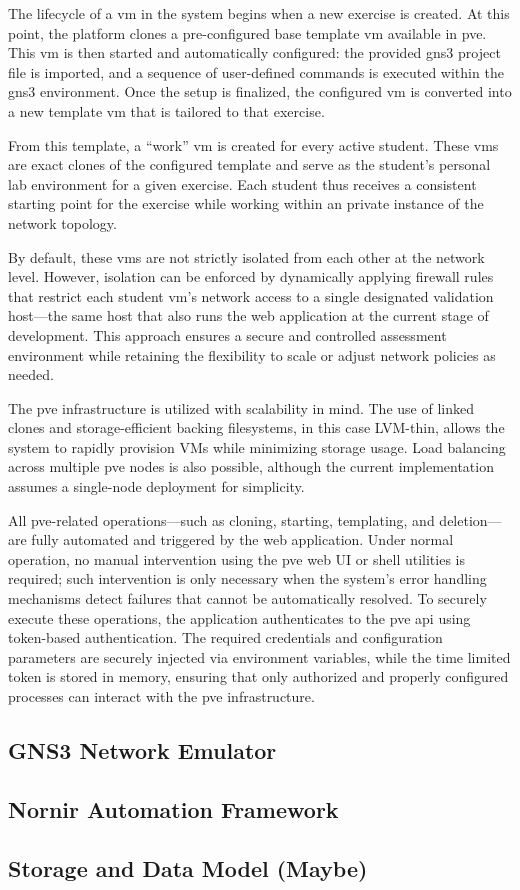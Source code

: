 The lifecycle of a \ac{vm} in the system begins when a new exercise is created. At this point, the platform clones a 
pre-configured base template \ac{vm} available in \ac{pve}. This \ac{vm} is then started and automatically configured: the 
provided \ac{gns3} project file is imported, and a sequence of user-defined commands is executed within the \ac{gns3} 
environment. Once the setup is finalized, the configured \ac{vm} is converted into a new template \ac{vm} that is tailored to 
that exercise.

From this template, a “work” \ac{vm} is created for every active student. These \ac{vm}s are exact clones of the configured 
template and serve as the student's personal lab environment for a given exercise. Each student thus receives a consistent 
starting point for the exercise while working within an private instance of the network topology.

By default, these \ac{vm}s are not strictly isolated from each other at the network level. However, isolation can be 
enforced by dynamically applying firewall rules that restrict each student \ac{vm}'s network access to a single designated 
validation host—the same host that also runs the web application at the current stage of development. This approach ensures 
a secure and controlled assessment environment while retaining the flexibility to scale or adjust network policies as needed.

The \ac{pve} infrastructure is utilized with scalability in mind. The use of linked clones and storage-efficient backing 
filesystems, in this case LVM-thin, allows the system to rapidly provision VMs while minimizing storage usage. Load 
balancing across multiple \ac{pve} nodes is also possible, although the current implementation assumes a single-node 
deployment for simplicity.

All \ac{pve}-related operations—such as cloning, starting, templating, and deletion—are fully automated and triggered by the 
web application. Under normal operation, no manual intervention using the \ac{pve} web UI or shell utilities is required; 
such intervention is only necessary when the system's error handling mechanisms detect failures that cannot be automatically 
resolved. To securely execute these operations, the application authenticates to the \ac{pve} \ac{api} using token-based 
authentication. The required credentials and configuration parameters are securely injected via environment variables, while 
the time limited token is stored in memory, ensuring that only authorized and properly configured processes can interact 
with the \ac{pve} infrastructure.
\subsection{GNS3 Network Emulator}

\subsection{Nornir Automation Framework}

\subsection{Storage and Data Model (Maybe)}
